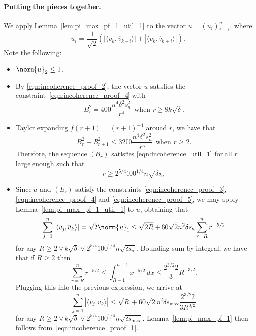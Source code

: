 \documentclass{article}
\newcommand{\abs}[1]{\left \lvert #1 \right \rvert}
\newcommand{\1}{\mathbf{1}}
\newcommand{\dotp}[2]{\langle #1, #2 \rangle}
\theoremstyle{alden}
\theoremstyle{aldenthm}
\theoremstyle{definition}
\theoremstyle{remark}
\begin{document}
\paragraph{Putting the pieces together.}
We apply Lemma~\ref{lem:pi_max_pf_1_util_1} to the vector $u = (u_i)_{i = 1}^{n}$, where
\begin{equation*}
u_i = \frac{1}{\sqrt{2}}\left(\abs{\dotp{v_k}{\overline{v}_{k - i}}} + \abs{\dotp{v_k}{\overline{v}_{k + i}}}\right).
\end{equation*}
Note the following:
\begin{itemize}
	\item $\norm{u}_2 \leq 1$.
	\item By \eqref{eqn:incoherence_proof_2}, the vector $u$ satisfies the constraint~\eqref{eqn:incoherence_proof_4} with
	\begin{equation*}
	B_r^2 = 400\frac{n^4\delta^2s_{n}^2}{r^4} ~~\textrm{when $r \geq 8 k \sqrt{\delta}$.}
	\end{equation*}
	\item Taylor expanding $f(r + 1) = (r + 1)^{-4}$ around $r$, we have that
	\begin{equation*}
	B_r^2 - B_{r + 1}^2 \leq 3200 \frac{n^4 \delta^2 s_{n}^2}{r^5} ~~\textrm{when $r \geq 2$.}
	\end{equation*}
	Therefore, the sequence $(B_r)$ satisfies \eqref{eqn:incoherence_util_1} for all $r$ large enough such that 
	\begin{equation*}
	r \geq 2^{5/4} 100^{1/4} n \sqrt{\delta s_{n}}
	\end{equation*}
	\item Since $u$ and $(B_r)$ satisfy the constraints \eqref{eqn:incoherence_proof_3}, \eqref{eqn:incoherence_proof_4} and \eqref{eqn:incoherence_proof_5}, we may apply Lemma~\ref{lem:pi_max_pf_1_util_1} to $u$, obtaining that
	\begin{equation*}
	\sum_{j = 1}^{n} \abs{\dotp{v_j}{\overline{v}_k}} = \sqrt{2}\norm{u}_1 \leq \sqrt{2R} + 60\sqrt{2} n^2 \delta s_{n} \sum_{r = R}^{n} r^{-5/2}
	\end{equation*}
	for any $R \geq 2 \vee k\sqrt{\delta} \vee 2^{5/4} 100^{1/4} n \sqrt{\delta s_{n}}$. Bounding sum by integral, we have that if $R \geq 2$ then
	\begin{equation*}
	\sum_{r = R}^{n} r^{-5/2} \leq \int_{R - 1}^{n - 1} x^{-5/2} \,dx \leq \frac{2^{3/2}2}{3} R^{-3/2}.
	\end{equation*}
	Plugging this into the previous expression, we arrive at
	\begin{equation*}
	\sum_{j = 1}^{n} \abs{\dotp{\overline{v}_j}{v_k}} \leq \sqrt{R} + 60 \sqrt{2} n^2 \delta s_{\max} \frac{2^{3/2}2}{3R^{3/2}}
	\end{equation*}
	for any $R \geq 2 \vee k\sqrt{\delta} \vee 2^{5/4} 100^{1/4} n \sqrt{\delta s_{\max}}$. Lemma~\ref{lem:pi_max_pf_1} then follows from~\eqref{eqn:incoherence_proof_1}.
\end{itemize}
\end{document}
